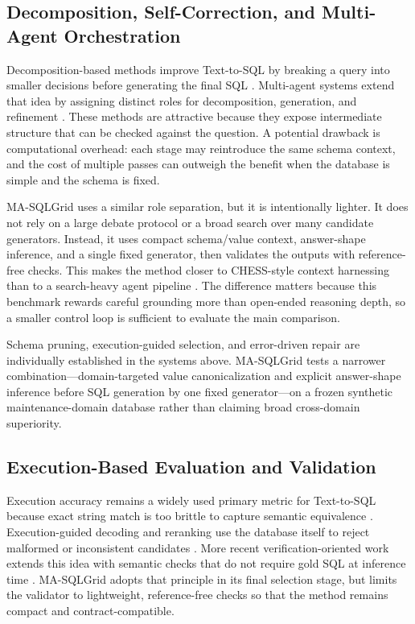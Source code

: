 \documentclass[cmc,article,submit,moreauthors,pdftex]{Definitions/tsp}
\begin{document}
\subsection{Decomposition, Self-Correction, and Multi-Agent Orchestration}\label{sect:rw2}

Decomposition-based methods improve Text-to-SQL by breaking a query into smaller decisions before generating the final SQL \cite{liu2023divide,pourreza2023dinsql,arora2023adapt,xie2024decomposition}. Multi-agent systems extend that idea by assigning distinct roles for decomposition, generation, and refinement \cite{wang2023macsql,xie2024magsql,cen2025sqlfixagent}. These methods are attractive because they expose intermediate structure that can be checked against the question. A potential drawback is computational overhead: each stage may reintroduce the same schema context, and the cost of multiple passes can outweigh the benefit when the database is simple and the schema is fixed.

MA-SQLGrid uses a similar role separation, but it is intentionally lighter. It does not rely on a large debate protocol or a broad search over many candidate generators. Instead, it uses compact schema/value context, answer-shape inference, and a single fixed generator, then validates the outputs with reference-free checks. This makes the method closer to CHESS-style context harnessing than to a search-heavy agent pipeline \cite{talaei2024chess,wang2023macsql,pourreza2023dinsql}. The difference matters because this benchmark rewards careful grounding more than open-ended reasoning depth, so a smaller control loop is sufficient to evaluate the main comparison.

Schema pruning, execution-guided selection, and error-driven repair are individually established in the systems above. MA-SQLGrid tests a narrower combination---domain-targeted value canonicalization and explicit answer-shape inference before SQL generation by one fixed generator---on a frozen synthetic maintenance-domain database rather than claiming broad cross-domain superiority.

\subsection{Execution-Based Evaluation and Validation}\label{sect:rw3}

Execution accuracy remains a widely used primary metric for Text-to-SQL because exact string match is too brittle to capture semantic equivalence \cite{zhong2020semantic,katsogiannismeimarakis2023survey,guo2023evaluating}. Execution-guided decoding and reranking use the database itself to reject malformed or inconsistent candidates \cite{wang2021executions,chen2023texttosql,li2024select}. More recent verification-oriented work extends this idea with semantic checks that do not require gold SQL at inference time \cite{huang2024survey,beyer2022verification,pauwels2024validation}. MA-SQLGrid adopts that principle in its final selection stage, but limits the validator to lightweight, reference-free checks so that the method remains compact and contract-compatible.
\end{document}
